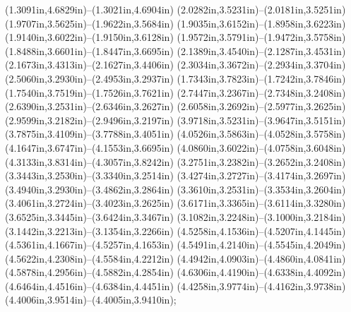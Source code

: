 (1.3091in,4.6829in)--(1.3021in,4.6904in) (2.0282in,3.5231in)--(2.0181in,3.5251in) (1.9707in,3.5625in)--(1.9622in,3.5684in) (1.9035in,3.6152in)--(1.8958in,3.6223in) (1.9140in,3.6022in)--(1.9150in,3.6128in) (1.9572in,3.5791in)--(1.9472in,3.5758in) (1.8488in,3.6601in)--(1.8447in,3.6695in) (2.1389in,3.4540in)--(2.1287in,3.4531in) (2.1673in,3.4313in)--(2.1627in,3.4406in) (2.3034in,3.3672in)--(2.2934in,3.3704in) (2.5060in,3.2930in)--(2.4953in,3.2937in) (1.7343in,3.7823in)--(1.7242in,3.7846in) (1.7540in,3.7519in)--(1.7526in,3.7621in) (2.7447in,3.2367in)--(2.7348in,3.2408in) (2.6390in,3.2531in)--(2.6346in,3.2627in) (2.6058in,3.2692in)--(2.5977in,3.2625in) (2.9599in,3.2182in)--(2.9496in,3.2197in) (3.9718in,3.5231in)--(3.9647in,3.5151in) (3.7875in,3.4109in)--(3.7788in,3.4051in) (4.0526in,3.5863in)--(4.0528in,3.5758in) (4.1647in,3.6747in)--(4.1553in,3.6695in) (4.0860in,3.6022in)--(4.0758in,3.6048in) (4.3133in,3.8314in)--(4.3057in,3.8242in) (3.2751in,3.2382in)--(3.2652in,3.2408in) (3.3443in,3.2530in)--(3.3340in,3.2514in) (3.4274in,3.2727in)--(3.4174in,3.2697in) (3.4940in,3.2930in)--(3.4862in,3.2864in) (3.3610in,3.2531in)--(3.3534in,3.2604in) (3.4061in,3.2724in)--(3.4023in,3.2625in) (3.6171in,3.3365in)--(3.6114in,3.3280in) (3.6525in,3.3445in)--(3.6424in,3.3467in) (3.1082in,3.2248in)--(3.1000in,3.2184in) (3.1442in,3.2213in)--(3.1354in,3.2266in) (4.5258in,4.1536in)--(4.5207in,4.1445in) (4.5361in,4.1667in)--(4.5257in,4.1653in) (4.5491in,4.2140in)--(4.5545in,4.2049in) (4.5622in,4.2308in)--(4.5584in,4.2212in) (4.4942in,4.0903in)--(4.4860in,4.0841in) (4.5878in,4.2956in)--(4.5882in,4.2854in) (4.6306in,4.4190in)--(4.6338in,4.4092in) (4.6464in,4.4516in)--(4.6384in,4.4451in) (4.4258in,3.9774in)--(4.4162in,3.9738in) (4.4006in,3.9514in)--(4.4005in,3.9410in);
